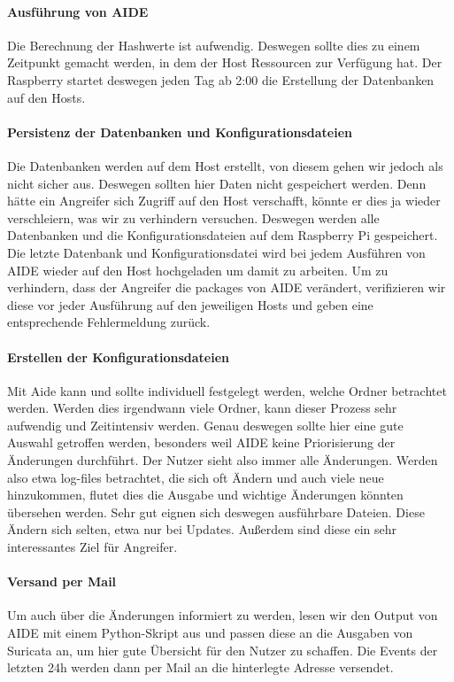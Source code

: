 \documentclass{article}
\begin{document}
\paragraph{Ausführung von AIDE}
Die Berechnung der Hashwerte ist aufwendig. Deswegen sollte dies zu einem Zeitpunkt gemacht werden, in dem der Host Ressourcen zur Verfügung hat. Der Raspberry startet deswegen jeden Tag ab 2:00 die Erstellung der Datenbanken auf den Hosts.

\paragraph{Persistenz der Datenbanken und Konfigurationsdateien}
Die Datenbanken werden auf dem Host erstellt, von diesem gehen wir jedoch als nicht sicher aus. Deswegen sollten hier Daten nicht gespeichert werden. Denn hätte ein Angreifer sich Zugriff auf den Host verschafft, könnte er dies ja wieder verschleiern, was wir zu verhindern versuchen. Deswegen werden alle Datenbanken und die Konfigurationsdateien auf dem Raspberry Pi gespeichert. Die letzte Datenbank und Konfigurationsdatei wird bei jedem Ausführen von AIDE wieder auf den Host hochgeladen um damit zu arbeiten.
Um zu verhindern, dass der Angreifer die packages von AIDE verändert, verifizieren wir diese vor jeder Ausführung auf den jeweiligen Hosts und geben eine entsprechende Fehlermeldung zurück.

\paragraph{Erstellen der Konfigurationsdateien}
Mit Aide kann und sollte individuell festgelegt werden, welche Ordner betrachtet werden. Werden dies irgendwann viele Ordner, kann dieser Prozess sehr aufwendig und Zeitintensiv werden. Genau deswegen sollte hier eine gute Auswahl getroffen werden, besonders weil AIDE keine Priorisierung der Änderungen durchführt.
Der Nutzer sieht also immer alle Änderungen. Werden also etwa log-files betrachtet, die sich oft Ändern und auch viele neue hinzukommen, flutet dies die Ausgabe und wichtige Änderungen könnten übersehen werden.
Sehr gut eignen sich deswegen ausführbare Dateien. Diese Ändern sich selten, etwa nur bei Updates. Außerdem sind diese ein sehr interessantes Ziel für Angreifer.

\paragraph{Versand per Mail}
Um auch über die Änderungen informiert zu werden, lesen wir den Output von AIDE mit einem Python-Skript aus und passen diese an die Ausgaben von Suricata an, um hier gute Übersicht für den Nutzer zu schaffen.
Die Events der letzten 24h werden dann per Mail an die hinterlegte Adresse versendet.
\end{document}
